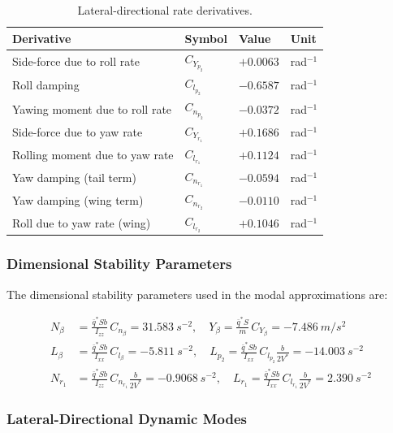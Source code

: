 \begin{table}[H]
  \centering
  \caption{Lateral-directional rate derivatives.}
  \label{tab:lat_rate}
  \begin{tabular}{llll}
    \toprule
    \textbf{Derivative} & \textbf{Symbol} & \textbf{Value} & \textbf{Unit} \\
    \midrule
    Side-force due to roll rate    & $C_{Y_{p_2}}$ & $+0.0063$ & rad$^{-1}$ \\
    Roll damping                   & $C_{l_{p_2}}$ & $-0.6587$ & rad$^{-1}$ \\
    Yawing moment due to roll rate & $C_{n_{p_2}}$ & $-0.0372$ & rad$^{-1}$ \\
    Side-force due to yaw rate     & $C_{Y_{r_1}}$ & $+0.1686$ & rad$^{-1}$ \\
    Rolling moment due to yaw rate & $C_{l_{r_1}}$ & $+0.1124$ & rad$^{-1}$ \\
    Yaw damping (tail term)        & $C_{n_{r_1}}$ & $-0.0594$ & rad$^{-1}$ \\
    Yaw damping (wing term)        & $C_{n_{r_2}}$ & $-0.0110$ & rad$^{-1}$ \\
    Roll due to yaw rate (wing)    & $C_{l_{r_2}}$ & $+0.1046$ & rad$^{-1}$ \\
    \bottomrule
  \end{tabular}
\end{table}

\subsubsection{Dimensional Stability Parameters}

The dimensional stability parameters used in the modal approximations are:

\begin{align}
  N_\beta  &= \frac{\bar{q}^*Sb}{I_{zz}}\,C_{n_\beta} = \SI{31.583}{s^{-2}}, \quad
  Y_\beta   = \frac{\bar{q}^*S}{m}\,C_{Y_\beta}       = \SI{-7.486}{m/s^2}  \\[4pt]
  L_\beta  &= \frac{\bar{q}^*Sb}{I_{xx}}\,C_{l_\beta} = \SI{-5.811}{s^{-2}}, \quad
  L_{p_2}  = \frac{\bar{q}^*Sb}{I_{xx}}\,C_{l_{p_2}}\frac{b}{2V^*} = \SI{-14.003}{s^{-2}} \\[4pt]
  N_{r_1}  &= \frac{\bar{q}^*Sb}{I_{zz}}\,C_{n_{r_1}}\frac{b}{2V^*} = \SI{-0.9068}{s^{-2}}, \quad
  L_{r_1}  = \frac{\bar{q}^*Sb}{I_{xx}}\,C_{l_{r_1}}\frac{b}{2V^*}  = \SI{2.390}{s^{-2}}
\end{align}

\subsubsection{Lateral-Directional Dynamic Modes}

